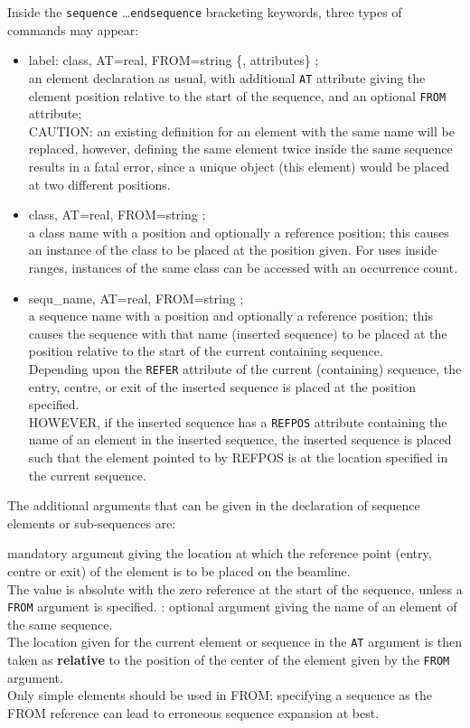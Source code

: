 Inside the {\tt sequence} \ldots {\tt endsequence} bracketing keywords,
three types of commands may appear:  
\begin{itemize}
  \item label: class, AT=real, FROM=string \{, attributes\} ;\\
    an element declaration as usual, with additional {\tt AT}
    attribute giving the element position relative to the start of the
    sequence, and an optional {\tt FROM} attribute; \\
    CAUTION: an existing definition for an element with the
    same name will be replaced, however, defining the same element
    twice inside the same sequence results in a fatal error, since a
    unique object (this element) would be placed at two different
    positions. 
  \item class, AT=real, FROM=string ;\\
    a class name with a position and optionally a reference position; 
    this causes an instance of the class to be placed at the position
    given. For uses inside ranges, instances of the same class can be
    accessed with an occurrence count.  
  \item sequ\_name, AT=real, FROM=string ;\\
    a sequence name with a position and optionally a reference position; 
    this causes the sequence with that name (inserted sequence) to be
    placed at the position relative to the start of the current
    containing sequence. \\ 
    Depending upon the {\tt REFER} attribute of the current (containing)
    sequence, the entry, centre, or exit of the inserted sequence is
    placed at the position specified. \\
    HOWEVER, if the inserted sequence has a {\tt REFPOS} attribute containing
    the name of an element in the inserted sequence, the inserted sequence
    is placed such that the element pointed to by REFPOS is at the location
    specified in the current sequence.
\end{itemize} 


The additional arguments that can be given in the declaration of sequence 
elements or sub-sequences are: 
\begin{madlist}
   mandatory argument giving the location at
  which the reference point (entry, centre or exit) of the element is to
  be placed on the beamline. \\  
  The value is absolute with the zero reference at the start of the
  sequence, unless a {\tt FROM} argument is specified. 
  : optional argument giving the name of an
  element of the same sequence. \\  
  The location given for the current element or sequence in the {\tt AT}
  argument is then taken as {\bf relative}  to the position of the
  center of the element given by the {\tt FROM} argument. \\
  Only simple elements should be used in FROM; specifying a sequence 
  as the FROM reference can lead to erroneous sequence expansion at best.  
\end{madlist}


